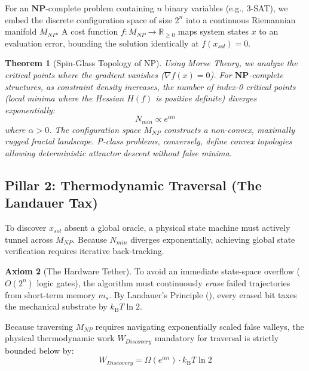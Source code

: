 \documentclass[12pt, a4paper]{article}
\newcommand{\NPc}{\mathbf{NP}}
\newcommand{\kB}{k_{\text{B}}}
\newcommand{\R}{\mathbb{R}}
\theoremstyle{plain}
\newtheorem{theorem}{Theorem}[section]
\theoremstyle{definition}
\newtheorem{axiom}[theorem]{Axiom}
\theoremstyle{remark}
\begin{document}
For an $\NPc$-complete problem containing $n$ binary variables (e.g., 3-SAT), we embed the discrete configuration space of size $2^n$ into a continuous Riemannian manifold $M_{NP}$. A cost function $f: M_{NP} \to \R_{\geq 0}$ maps system states $x$ to an evaluation error, bounding the solution identically at $f(x_{sol}) = 0$.

\begin{theorem}[Spin-Glass Topology of NP]
  Using Morse Theory, we analyze the critical points where the gradient vanishes ($\nabla f(x) = 0$). For $\NPc$-complete structures, as constraint density increases, the number of index-0 critical points (local minima where the Hessian $H(f)$ is positive definite) diverges exponentially:
  \begin{equation}
    N_{min} \propto e^{\alpha n}
  \end{equation}
  where $\alpha > 0$. The configuration space $M_{NP}$ constructs a non-convex, maximally rugged fractal landscape. P-class problems, conversely, define convex topologies allowing deterministic attractor descent without false minima.
\end{theorem}

\subsection{Pillar 2: Thermodynamic Traversal (The Landauer Tax)}

To discover $x_{sol}$ absent a global oracle, a physical state machine must actively tunnel across $M_{NP}$. Because $N_{min}$ diverges exponentially, achieving global state verification requires iterative back-tracking.

\begin{axiom}[The Hardware Tether]\label{ax:tctt}
To avoid an immediate state-space overflow ($O(2^n)$ logic gates), the algorithm must continuously \emph{erase} failed trajectories from short-term memory $m_s$. By Landauer's Principle (), every erased bit taxes the mechanical substrate by $\kB T \ln 2$.
\end{axiom}

Because traversing $M_{NP}$ requires navigating exponentially scaled false valleys, the physical thermodynamic work $W_{Discovery}$ mandatory for traversal is strictly bounded below by:
\begin{equation}\label{eq:search_cost}
    W_{Discovery} = \Omega(e^{\alpha n}) \cdot \kB T \ln 2
\end{equation}
\end{document}
